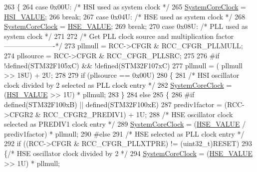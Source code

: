 \begin{DoxyCode}
263   \{
264     \textcolor{keywordflow}{case} 0x00U:  \textcolor{comment}{/* HSI used as system clock */}
265       \hyperlink{group__STM32F1xx__System__Private__Variables_gaa3cd3e43291e81e795d642b79b6088e6}{SystemCoreClock} = \hyperlink{group__STM32F1xx__System__Private__Defines_gaaa8c76e274d0f6dd2cefb5d0b17fbc37}{HSI\_VALUE};
266       \textcolor{keywordflow}{break};
267     \textcolor{keywordflow}{case} 0x04U:  \textcolor{comment}{/* HSE used as system clock */}
268       \hyperlink{group__STM32F1xx__System__Private__Variables_gaa3cd3e43291e81e795d642b79b6088e6}{SystemCoreClock} = \hyperlink{group__STM32F1xx__System__Private__Defines_gaeafcff4f57440c60e64812dddd13e7cb}{HSE\_VALUE};
269       \textcolor{keywordflow}{break};
270     \textcolor{keywordflow}{case} 0x08U:  \textcolor{comment}{/* PLL used as system clock */}
271 
272       \textcolor{comment}{/* Get PLL clock source and multiplication factor ----------------------*/}
273       pllmull = RCC->CFGR & RCC\_CFGR\_PLLMULL;
274       pllsource = RCC->CFGR & RCC\_CFGR\_PLLSRC;
275       
276 \textcolor{preprocessor}{#if !defined(STM32F105xC) && !defined(STM32F107xC)      }
277       pllmull = ( pllmull >> 18U) + 2U;
278       
279       \textcolor{keywordflow}{if} (pllsource == 0x00U)
280       \{
281         \textcolor{comment}{/* HSI oscillator clock divided by 2 selected as PLL clock entry */}
282         \hyperlink{group__STM32F1xx__System__Private__Variables_gaa3cd3e43291e81e795d642b79b6088e6}{SystemCoreClock} = (\hyperlink{group__STM32F1xx__System__Private__Defines_gaaa8c76e274d0f6dd2cefb5d0b17fbc37}{HSI\_VALUE} >> 1U) * pllmull;
283       \}
284       \textcolor{keywordflow}{else}
285       \{
286 \textcolor{preprocessor}{ #if defined(STM32F100xB) || defined(STM32F100xE)}
287        prediv1factor = (RCC->CFGR2 & RCC\_CFGR2\_PREDIV1) + 1U;
288        \textcolor{comment}{/* HSE oscillator clock selected as PREDIV1 clock entry */}
289        \hyperlink{group__STM32F1xx__System__Private__Variables_gaa3cd3e43291e81e795d642b79b6088e6}{SystemCoreClock} = (\hyperlink{group__STM32F1xx__System__Private__Defines_gaeafcff4f57440c60e64812dddd13e7cb}{HSE\_VALUE} / prediv1factor) * pllmull; 
290 \textcolor{preprocessor}{ #else}
291         \textcolor{comment}{/* HSE selected as PLL clock entry */}
292         \textcolor{keywordflow}{if} ((RCC->CFGR & RCC\_CFGR\_PLLXTPRE) != (uint32\_t)RESET)
293         \{\textcolor{comment}{/* HSE oscillator clock divided by 2 */}
294           \hyperlink{group__STM32F1xx__System__Private__Variables_gaa3cd3e43291e81e795d642b79b6088e6}{SystemCoreClock} = (\hyperlink{group__STM32F1xx__System__Private__Defines_gaeafcff4f57440c60e64812dddd13e7cb}{HSE\_VALUE} >> 1U) * pllmull;

\end{DoxyCode}
